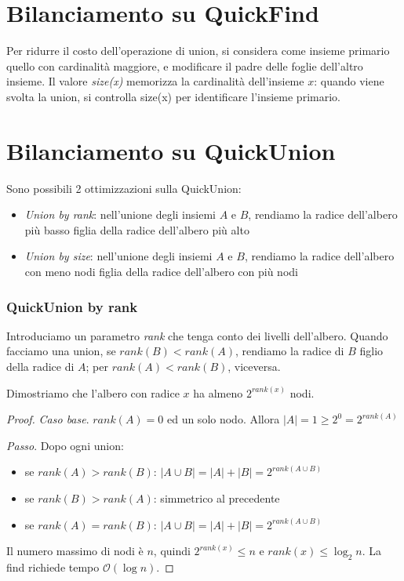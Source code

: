 \documentclass[11pt]{book}
\begin{document}
\section{Bilanciamento su QuickFind}
Per ridurre il costo dell'operazione di union, si considera come insieme primario quello con cardinalità maggiore, e modificare 
il padre delle foglie dell'altro insieme. Il valore \textit{size(x)} memorizza la cardinalità dell'insieme $x$: quando 
viene svolta la union, si controlla size(x) per identificare l'insieme primario.
\section{Bilanciamento su QuickUnion}
Sono possibili 2 ottimizzazioni sulla QuickUnion:
\begin{itemize}
    \item \textit{Union by rank}: nell'unione degli insiemi $A$ e $B$, rendiamo la radice dell'albero più basso figlia della 
    radice dell'albero più alto 
    \item \textit{Union by size}: nell'unione degli insiemi $A$ e $B$, rendiamo la radice dell'albero con meno nodi figlia 
    della radice dell'albero con più nodi 
\end{itemize}
\subsubsection{QuickUnion by rank}
Introduciamo un parametro \textit{rank} che tenga conto dei livelli dell'albero. Quando facciamo una union, se 
$rank(B)<rank(A)$, rendiamo la radice di $B$ figlio della radice di $A$; per $rank(A)<rank(B)$, viceversa.

Dimostriamo che l'albero con radice $x$ ha almeno $2^{rank(x)}$ nodi.
\begin{proof}
    \textit{Caso base}. $rank(A)=0$ ed un solo nodo. Allora $|A|=1\geq 2^0=2^{rank(A)}$

    \textit{Passo}. Dopo ogni union:
    \begin{itemize}
        \item se $rank(A)>rank(B)$: $|A\cup B|=|A|+|B|=2^{rank(A\cup B)}$
        \item se $rank(B)>rank(A)$: simmetrico al precedente 
        \item se $rank(A)=rank(B)$: $|A\cup B|=|A|+|B|=2^{rank(A\cup B)}$
    \end{itemize}
    Il numero massimo di nodi è $n$, quindi $2^{rank(x)}\leq n$ e $rank(x)\leq \log_2n$. La find richiede tempo $\mathcal{O}(\log n)$.
\end{proof}
\end{document}
